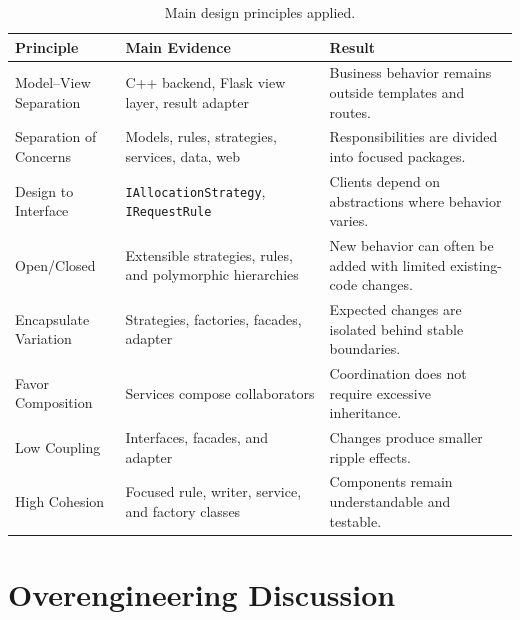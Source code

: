 \documentclass[12pt,a4paper]{article}
\begin{document}
\begin{table}[H]
    \centering
    \small
    \caption{Main design principles applied.}
    \begin{tabularx}{\textwidth}{L{3.8cm}L{5cm}Y}
        \toprule
        \textbf{Principle}
        & \textbf{Main Evidence}
        & \textbf{Result} \\
        \midrule

        Model--View Separation
        & C++ backend, Flask view layer, result adapter
        & Business behavior remains outside templates and routes. \\

        Separation of Concerns
        & Models, rules, strategies, services, data, web
        & Responsibilities are divided into focused packages. \\

        Design to Interface
        & \texttt{IAllocationStrategy}, \texttt{IRequestRule}
        & Clients depend on abstractions where behavior varies. \\

        Open/Closed
        & Extensible strategies, rules, and polymorphic hierarchies
        & New behavior can often be added with limited existing-code changes. \\

        Encapsulate Variation
        & Strategies, factories, facades, adapter
        & Expected changes are isolated behind stable boundaries. \\

        Favor Composition
        & Services compose collaborators
        & Coordination does not require excessive inheritance. \\

        Low Coupling
        & Interfaces, facades, and adapter
        & Changes produce smaller ripple effects. \\

        High Cohesion
        & Focused rule, writer, service, and factory classes
        & Components remain understandable and testable. \\

        \bottomrule
    \end{tabularx}
\end{table}

\section{Overengineering Discussion}
\end{document}
